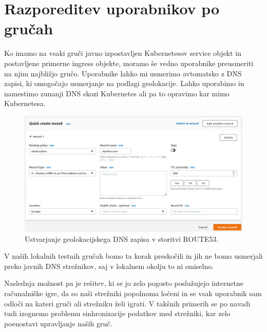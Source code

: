 \documentclass[a4paper, 12pt]{book}
\begin{document}
\section{Razporeditev uporabnikov po gručah}
Ko imamo na vsaki gruči javno izpostavljen Kubernetesov service objekt in postavljene primerne ingress objekte, moramo še vedno uporabnike preusmeriti na njim najbližjo gručo.
Uporabnike lahko mi usmerimo avtomatsko z DNS zapisi, ki omogočajo usmerjanje na podlagi geolokacije.
  Lahko uporabimo in namestimo zunanji DNS skozi Kubernetes ali pa to opravimo kar mimo Kubernetesa.
\begin{figure}[h]
\begin{center}
\includegraphics[width=1.0\textwidth]{images/geolokacijski-dns.png}
\end{center}
\caption{Ustvarjanje geolokacijskega DNS zapisa v storitvi ROUTE53.}
\label{primer-ustvarjanje-geolokacijskega-zapisa}
\end{figure}
V naših lokalnih testnih gručah bomo ta korak preskočili in jih ne bomo usmerjali preko javnih DNS strežnikov, saj v lokalnem okolju to ni smiselno.

Naslednja možnost pa je rešitev, ki se jo zelo pogosto poslužujejo internetne računalniške igre, da so naši strežniki popolnoma ločeni in se vsak uporabnik sam odloči na kateri gruči ali strežniku želi igrati.
V takšnih primerih se po navadi tudi izognemo problemu sinhronizacije podatkov med strežniki, kar zelo poenostavi upravljanje naših gruč.
\end{document}
